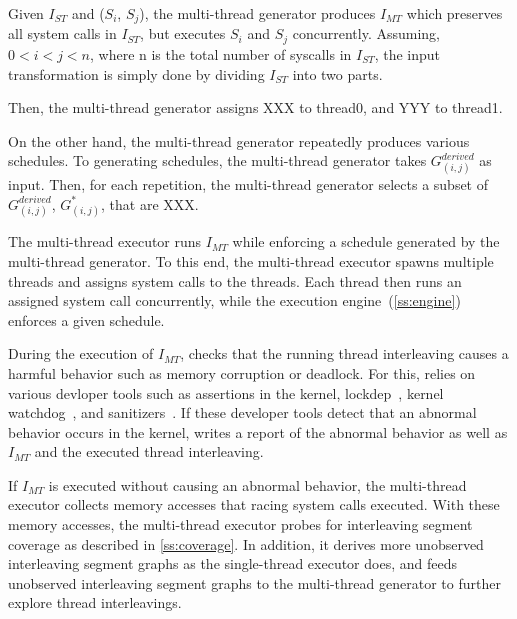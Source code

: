 %   
Given $I_{ST}$ and ($S_i$, $S_j$), the multi-thread generator produces
$I_{MT}$ which preserves all system calls in $I_{ST}$, but executes
$S_i$ and $S_j$ concurrently.
%
Assuming, $0 < i < j < n$, where n is the total number of syscalls in
$I_{ST}$, the input transformation is simply done by dividing
$I_{ST}$ into two parts.

%
Then, the multi-thread generator assigns XXX to thread0, and YYY to
thread1.




On the other hand, the multi-thread generator repeatedly produces
various schedules.
%
To generating schedules, the multi-thread generator takes
$G^{derived}_{(i,j)}$ as input.
%
Then, for each repetition, the multi-thread generator selects a subset
of $G^{derived}_{(i,j)}$, $G^{*}_{(i,j)}$, that are XXX.






%
The multi-thread executor runs $I_{MT}$ while enforcing a schedule
generated by the multi-thread generator.
%
To this end, the multi-thread executor spawns multiple threads and
assigns system calls to the threads.
%
Each thread then runs an assigned system call concurrently, while
the execution engine~(\autoref{ss:engine}) enforces a given schedule.


During the execution of $I_{MT}$, \sys checks that the running thread
interleaving causes a harmful behavior such as memory corruption or
deadlock.
%
For this, \sys relies on various devloper tools such as assertions in
the kernel, lockdep~\cite{lockdep}, kernel watchdog~\cite{watchdog}, and
sanitizers~\cite{kasan, ubsan, asan}.
%
If these developer tools detect that an abnormal behavior occurs in
the kernel, \sys writes a report of the abnormal behavior as well as
$I_{MT}$ and the executed thread interleaving.







If $I_{MT}$ is executed without causing an abnormal behavior, the
multi-thread executor collects memory accesses that racing system
calls executed.
%
With these memory accesses, the multi-thread executor probes for
interleaving segment coverage as described in
\autoref{ss:coverage}. In addition, it derives more unobserved
interleaving segment graphs as the single-thread executor does, and
feeds unobserved interleaving segment graphs to the multi-thread
generator to further explore thread interleavings.







